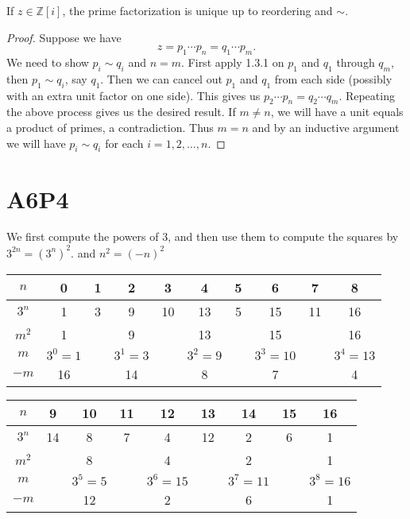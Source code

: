\documentclass{article}
\begin{document}
\begin{theorem}
If $z \in \mathbb{Z}[i]$, the prime factorization is unique up to reordering and $\sim$.
\end{theorem}

\begin{proof}
Suppose we have
$$z = p_1\cdots p_n = q_1\cdots p_m.$$
We need to show $p_i \sim q_i$ and $n =m$. First apply  1.3.1 on $p_1$ and $q_1$ through $q_m$, then $p_1 \sim q_i$, say $q_1$. Then we can cancel out $p_1$ and $q_1$ from each side (possibly with an extra unit factor on one side). This gives us $p_2\cdots p_n=q_2\cdots q_m$. Repeating the above process gives us the desired result. If $m \neq n$, we will have a unit equals a product of primes, a contradiction. Thus $m =n$ and by an inductive argument we will have $p_i \sim q_i$ for each $i = 1, 2, \ldots, n.$
\end{proof}

\pagebreak
\section{A6P4}
We first compute the powers of 3, and then use them to compute the squares by $3^{2n}=(3^n)^2.$ and $n^2=(-n)^2$
\begin{table}[h]
\begin{tabular}{|c|c|c|c|c|c|c|c|c|c|}
\hline
$n$   & 0       & 1 & 2       & 3  & 4       & 5 & 6        & 7  & 8        \\ \hline
$3^n$ & 1       & 3 & 9       & 10 & 13      & 5 & 15       & 11 & 16       \\ \hline
$m^2$ & 1       &   & 9       &    & 13      &   & 15       &    & 16       \\ \hline
$m$   & $3^0=1$ &   & $3^1=3$ &    & $3^2=9$ &   & $3^3=10$ &    & $3^4=13$ \\ \hline
$-m$  & 16      &   & 14      &    & 8       &   & 7        &    & 4        \\ \hline
\end{tabular}
\end{table}

\begin{table}[h]
\begin{tabular}{|c|c|c|c|c|c|c|c|c|}
\hline
$n$   & 9  & 10      & 11 & 12       & 13 & 14       & 15 & 16       \\ \hline
$3^n$ & 14 & 8       & 7  & 4        & 12 & 2        & 6  & 1        \\ \hline
$m^2$ &    & 8       &    & 4        &    & 2        &    & 1        \\ \hline
$m$   &    & $3^5=5$ &    & $3^6=15$ &    & $3^7=11$ &    & $3^8=16$ \\ \hline
$-m$  &    & 12      &    & 2        &    & 6        &    & 1        \\ \hline
\end{tabular}
\end{table}
\def\lc{\left\lceil}   
\def\rc{\right\rceil}
\end{document}
